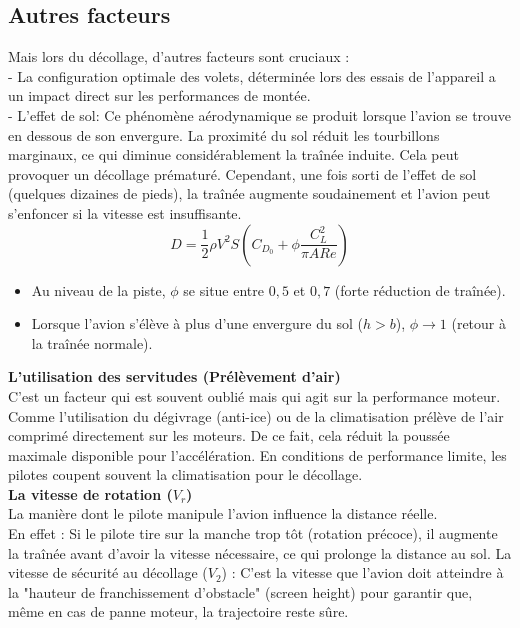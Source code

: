 			
			\subsection{Autres facteurs }
			Mais lors du décollage, d'autres facteurs sont cruciaux :\\
			
			- La configuration optimale des volets, déterminée lors des essais de l'appareil a un impact direct sur les performances de montée.\\
			
			- L'effet de sol: Ce phénomène aérodynamique se produit lorsque l'avion se trouve en dessous de son envergure. La proximité du sol réduit les tourbillons marginaux, ce qui diminue considérablement la traînée induite. Cela peut provoquer un décollage prématuré. Cependant, une fois sorti de l'effet de sol (quelques dizaines de pieds), la traînée augmente soudainement et l'avion peut s'enfoncer si la vitesse est insuffisante.\\
			
			\begin{equation}
				D = \frac{1}{2}\rho V^2 S \left( C_{D_0} + \phi \frac{C_L^2}{\pi AR e} \right)
			\end{equation}
			
			\begin{itemize}
				\item Au niveau de la piste, $\phi$ se situe entre $0{,}5$ et $0{,}7$ (forte réduction de traînée).
				\item Lorsque l'avion s'élève à plus d'une envergure du sol ($h > b$), $\phi \to 1$ (retour à la traînée normale).
			\end{itemize}
			
			
			\textbf {L'utilisation des servitudes (Prélèvement d'air) } \\
			
			C'est un facteur  qui est souvent oublié mais qui agit sur la performance moteur.
			Comme l'utilisation du dégivrage (anti-ice) ou de la climatisation prélève de l'air comprimé directement sur les moteurs.
			De ce fait, cela réduit la poussée maximale disponible pour l'accélération. En conditions de performance limite, les pilotes coupent souvent la climatisation pour le décollage.\\
			
			
				
			\textbf{La vitesse de rotation ($V_r$) } \\
			
			La manière dont le pilote manipule l'avion influence la distance réelle.\\
			En effet : Si le pilote tire sur la manche trop tôt (rotation précoce), il augmente la traînée avant d'avoir la vitesse nécessaire, ce qui prolonge la distance au sol.
			La vitesse de sécurité au décollage ($V_2$) : C'est la vitesse que l'avion doit atteindre à la "hauteur de franchissement d'obstacle" (screen height) pour garantir que, même en cas de panne moteur, la trajectoire reste sûre.
			
